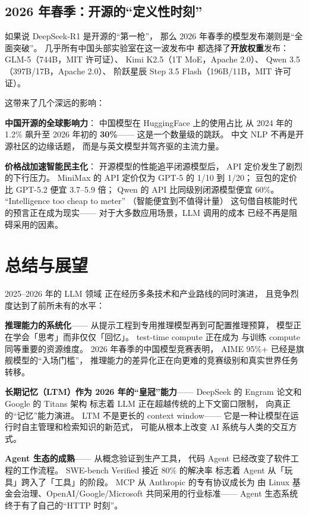 \subsection{2026 年春季：开源的``定义性时刻''}

如果说 DeepSeek-R1 是开源的``第一枪''，
那么 2026 年春季的模型发布潮则是``全面突破''。
几乎所有中国头部实验室在这一波发布中
都选择了\textbf{开放权重}发布：
GLM-5（744B，MIT 许可证）、
Kimi K2.5（1T MoE，Apache 2.0）、
Qwen 3.5（397B/17B，Apache 2.0）、
阶跃星辰 Step 3.5 Flash（196B/11B，MIT 许可证）。

这带来了几个深远的影响：

\textbf{中国开源的全球影响力}：
中国模型在 HuggingFace 上的使用占比
从 2024 年的 1.2\% 飙升至 2026 年初的 \textbf{30\%}——
这是一个数量级的跳跃。
中文 NLP 不再是开源社区的边缘话题，
而是与英文模型并驾齐驱的主流力量。

\textbf{价格战加速智能民主化}：
开源模型的性能追平闭源模型后，
API 定价发生了剧烈的下行压力。
MiniMax 的 API 定价仅为 GPT-5 的 1/10 到 1/20；
豆包的定价比 GPT-5.2 便宜 3.7--5.9 倍；
Qwen 的 API 比同级别闭源模型便宜 60\%。
``Intelligence too cheap to meter''
（智能便宜到不值得计量）
这句借自核能时代的预言正在成为现实——
对于大多数应用场景，LLM 调用的成本
已经不再是阻碍采用的因素。

\section{总结与展望}

2025--2026 年的 LLM 领域
正在经历多条技术和产业路线的同时演进，
且竞争烈度达到了前所未有的水平：

\textbf{推理能力的系统化}——
从提示工程到专用推理模型再到可配置推理预算，
模型正在学会「思考」而非仅仅「回忆」。
test-time compute 正在成为
与训练 compute 同等重要的资源维度。
2026 年春季的中国模型竞赛表明，
AIME 95\%+ 已经是旗舰模型的``入场门槛''，
推理能力的差异化正在向更难的竞赛级别和真实世界任务转移。

\textbf{长期记忆（LTM）作为 2026 年的``皇冠''能力}——
DeepSeek 的 Engram 论文和 Google 的 Titans 架构
标志着 LLM 正在超越传统的上下文窗口限制，
向真正的``记忆''能力演进。
LTM 不是更长的 context window——
它是一种让模型在运行时自主管理和检索知识的新范式，
可能从根本上改变 AI 系统与人类的交互方式。

\textbf{Agent 生态的成熟}——
从概念验证到生产工具，
代码 Agent 已经改变了软件工程的工作流程。
SWE-bench Verified 接近 80\% 的解决率
标志着 Agent 从「玩具」跨入了「工具」的阶段。
MCP 从 Anthropic 的专有协议成长为
由 Linux 基金会治理、OpenAI/Google/Microsoft 共同采用的行业标准——
Agent 生态系统终于有了自己的``HTTP 时刻''。

